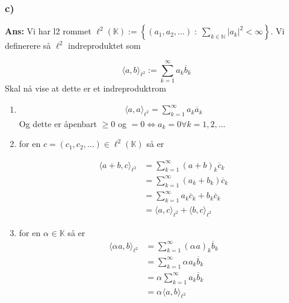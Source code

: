 \documentclass[11pt]{article}
\newenvironment{solbox}
  {\begin{mdframed}[linewidth=1pt,linecolor=black,roundcorner=5pt]
   \noindent\textbf{Ans: }\enspace}
  {\end{mdframed}}
\begin{document}
\subsubsection{c)}

\begin{solbox}
    Vi har l2 rommet $\ell^2(\mathbb{K}) := 
    \left\{ (a_1, a_2, \ldots) \; : \; 
    \sum_{k \in \mathbb{N}} |a_k|^2 < \infty 
    \right\}$. Vi definerere så $ \ell^2 $ indreproduktet som 

    \[
        \langle a, b \rangle _{\ell^2} := \sum_{ k=1 }^{ \infty } a_k \overline{b}_k
    \]
    Skal nå vise at dette er et indreproduktrom

    \begin{enumerate}
        \item \begin{align*}
            \langle a, a \rangle _{\ell^2} = \sum_{ k=1 }^{ \infty } a_k \overline{a}_k
        \end{align*}
        Og dette er åpenbart $ \geq 0 $ og $ =0 \Longleftrightarrow a_k=0 \forall k=1,2,...$  

        \item for en $ c = \left( c_1, c_2, ... \right) \in \ell^2 (\mathbb{K}) $ så er
        
        \begin{align*}
            \langle a+b, c \rangle _{\ell^2} &= \sum_{ k=1 }^{ \infty } \left( a + b \right) _k \overline{c}_k \\
            &= \sum_{ k=1 }^{ \infty } \left( a_k + b_k \right) \overline{c}_k \\
            &= \sum_{ k=1 }^{ \infty } a_k \overline{c}_k + b_k \overline{c}_k \\
            &= \langle a, c \rangle _{\ell^2} + \langle b, c \rangle _{\ell^2}
        \end{align*}

        \item for en $ \alpha_{}^{} \in \mathbb{K} $ så er  \begin{align*}
            \langle \alpha_{}^{} a, b \rangle_{ \ell^2 } &= \sum_{ k=1 }^{ \infty } \left( \alpha_{}^{} a \right) _k \overline{b}_k \\
            &= \sum_{ k=1 }^{ \infty } \alpha_{}^{} a_k \overline{b}_k \\
            &= \alpha_{}^{} \sum_{ k=1 }^{ \infty } a_k \overline{b}_k \\
            &= \alpha_{}^{} \langle a, b \rangle_{ \ell^2 } 
        \end{align*}


\end{enumerate}
\end{solbox}
\end{document}

